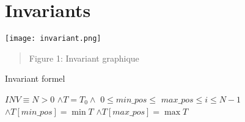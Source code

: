 \section{Invariants}\label{invariants}

\centering
\texttt{[image: invariant.png]}
\setlength{\marginparwidth}{10pt}
\begin{quote}
    \centering
    Figure 1: Invariant graphique
\end{quote}
\vspace{1.2cm}

Invariant formel
\par
\vspace{0.3cm}

$INV \overset{}{\equiv} N>0$
$\land T=T_0 \land$
$0 \leq min\_pos \leq$
$max\_pos \leq i \leq N-1$
$\land T[min\_pos]=\min T$
$\land T[max\_pos]=\max T$

\vspace{1.2cm}
\raggedright

